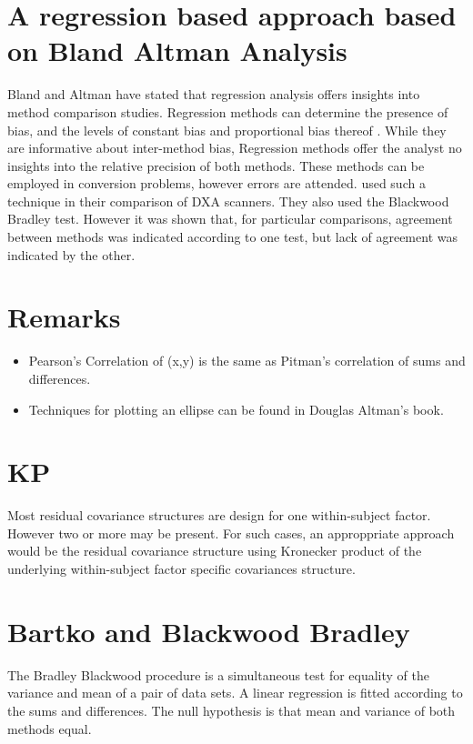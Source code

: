 \documentclass[MAIN.tex]{subfiles}
\begin{document}
	\section{A regression based approach based on Bland Altman Analysis}
	Bland and Altman have stated that regression analysis offers insights into method comparison studies. Regression methods can determine the presence of bias, and the levels of constant bias and proportional bias thereof \cite{ludbrook97,ludbrook02}.
	While they are informative about inter-method bias, Regression methods offer the analyst no insights into the relative precision of both methods. These methods can be employed in conversion problems, however errors are
	attended.
	\citet{lu2001} used such a technique in their comparison of DXA scanners. They also used the Blackwood Bradley test. However it was shown that, for particular comparisons, agreement between methods was indicated according to one test, but lack of agreement was indicated by the other.
	

	
	\section*{Remarks}
	\begin{itemize}
		\item Pearson's Correlation of (x,y) is the same as Pitman's correlation of sums and differences.
		
		\item Techniques for plotting an ellipse can be found in Douglas Altman's book.
	\end{itemize}

	\section{KP}
	Most residual covariance structures are design for one
	within-subject factor. However two or more may be present. For
	such cases, an approppriate approach would be the residual
	covariance structure using Kronecker product of the underlying
	within-subject factor specific covariances structure.
	



\section{Bartko and Blackwood Bradley}

The Bradley Blackwood procedure is a simultaneous test for equality of the variance and mean of a pair of data sets. 
A linear regression is fitted according to the sums and differences.
The null hypothesis is that mean and variance of both methods equal.
\end{document}
